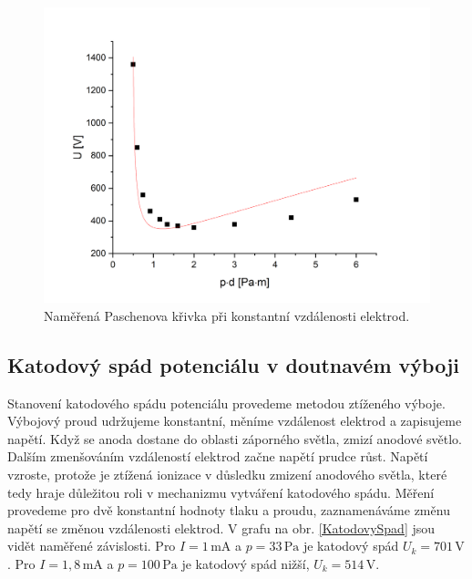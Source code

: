 \documentclass[a4paper,12pt]{article}
\begin{document}
\begin{figure}[h]
	\centering
	\includegraphics[width=130mm]{dfixed.png}
	\caption{Naměřená Paschenova křivka při konstantní vzdálenosti elektrod.}
	\label{dfixed}
\end{figure}

\subsection{Katodový spád potenciálu v doutnavém výboji}
Stanovení katodového spádu potenciálu provedeme metodou ztíženého výboje. Výbojový proud udržujeme konstantní, měníme vzdálenost elektrod a zapisujeme napětí. Když se anoda dostane do oblasti záporného světla, zmizí anodové světlo. Dalším zmenšováním vzdáleností elektrod začne napětí prudce růst. Napětí vzroste, protože je ztížená ionizace v důsledku zmizení anodového světla, které tedy hraje důležitou roli v mechanizmu vytváření katodového spádu. Měření provedeme pro dvě konstantní hodnoty tlaku a proudu, zaznamenáváme změnu napětí se změnou vzdálenosti elektrod. V grafu na obr. \ref{KatodovySpad} jsou vidět naměřené závislosti. Pro $I = 1\,\si{\milli\ampere}$ a $p = 33\,\si{\pascal}$ je katodový spád $U_k = 701\,\si{\volt}$. Pro $I = 1,8\,\si{\milli\ampere}$ a $p = 100\,\si{\pascal}$ je katodový spád nižší,  $U_k = 514\,\si{\volt}$.  
\end{document}
